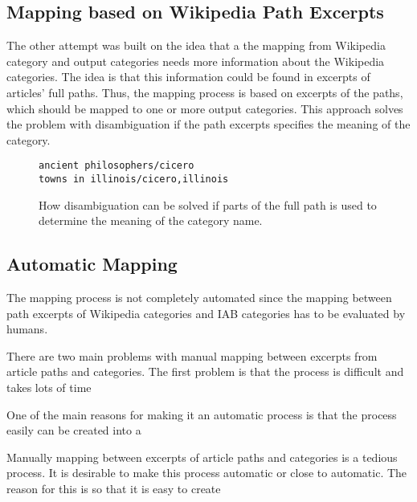 \subsection{Mapping based on Wikipedia Path Excerpts}
The other attempt was built on the idea that a the mapping from Wikipedia category and output categories needs more information about the Wikipedia categories. The idea is that this information could be found in excerpts of articles' full paths. Thus, the mapping process is based on excerpts of the paths, which should be mapped to one or more output categories. This approach solves the problem with disambiguation if the path excerpts specifies the meaning of the category. 

\begin{figure}
\centering
\begin{lstlisting}
ancient philosophers/cicero
towns in illinois/cicero,illinois
\end{lstlisting}
\caption[Avoiding disambiguation with excerpts of category paths]{How disambiguation can be solved if parts of the full path is used to determine the meaning of the category name.}
\label{fig:solving_disambiguation}
\end{figure}

\subsection{Automatic Mapping}
The mapping process is not completely automated since the mapping between path excerpts of Wikipedia categories and IAB categories has to be evaluated by humans. 

\begin{comment}
INSERT EXAMPLE ABOUT WALKING HERE. 
\end{comment}

There are two main problems with manual mapping between excerpts from article paths and categories. The first problem is that the process is difficult and takes lots of time

One of the main reasons for making it an automatic process is that the process easily can be created into a 


Manually mapping between excerpts of article paths and categories is a tedious process. It is desirable to make this  process automatic or close to automatic. The reason for this is so that it is easy to create 


